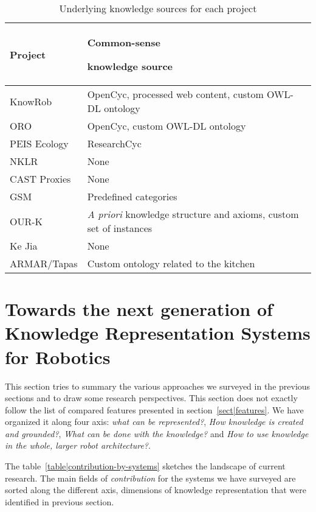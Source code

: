 \documentclass{IEEEtran}
\begin{document}
\begin{table}
\begin{center}

\begin{tabular}{lp{4cm}}
\toprule
{\bf Project} & {\bf Common-sense \par knowledge source} \\
\midrule
{\sc KnowRob} & {\sc OpenCyc}, processed web content, custom OWL-DL ontology \\
ORO & {\sc OpenCyc}, custom OWL-DL ontology \\
PEIS Ecology & {\sc ResearchCyc} \\
NKLR &  None \\
CAST Proxies &  None \\
GSM &  Predefined categories \\
OUR-K & {\it A priori} knowledge structure and axioms, custom set of instances\\
Ke Jia & None \\
ARMAR/{\sc Tapas} & Custom ontology related to the kitchen\\

\bottomrule

\end{tabular}
\end{center}
\caption{Underlying knowledge sources for each project}
\label{table|knowledge-sources}
\end{table}


\section{Towards the next generation of Knowledge Representation Systems for Robotics}
\label{sect|conclusion}

This section tries to summary the various approaches we surveyed in the
previous sections and to draw some research perspectives. This section does not
exactly follow the list of compared features presented in
section~\ref{sect|features}. We have organized it along four axis: \emph{what
can be represented?}, \emph{How knowledge is created and grounded?}, \emph{What
can be done with the knowledge?} and \emph{How to use knowledge in the whole,
larger robot architecture?}.

The table~\ref{table|contribution-by-systems} sketches the landscape of current
research. The main fields of \emph{contribution} for the systems we have
surveyed are sorted along the different axis, dimensions of knowledge
representation that were identified in previous section.
\end{document}
